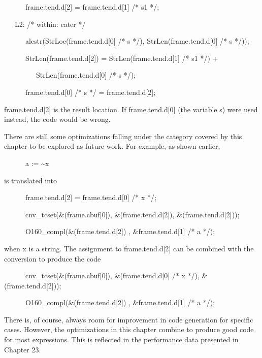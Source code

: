 {\ttfamily\mdseries
\ \ \ \ \ \ frame.tend.d[2] = frame.tend.d[1] /* s1 */;}

{\ttfamily\mdseries
\ \ \ L2: /* within: cater */}

{\ttfamily\mdseries
\ \ \ \ \ \ alcstr(StrLoc(frame.tend.d[0] /* s */), StrLen(frame.tend.d[0] /* s */));}

{\ttfamily\mdseries
\ \ \ \ \ \ StrLen(frame.tend.d[2]) = StrLen(frame.tend.d[1] /* s1 */) +}

{\ttfamily\mdseries
\ \ \ \ \ \ \ \ \ StrLen(frame.tend.d[0] /* s */);}


\bigskip

{\ttfamily\mdseries
\ \ \ \ \ \ frame.tend.d[0] /* s */ = frame.tend.d[2];}


frame.tend.d[2] is the result location. If frame.tend.d[0] (the
variable s) were used instead, the code would be wrong.


There are still some optimizations falling under the category covered
by this chapter to be explored as future work. For example, as shown
earlier,

{\ttfamily\mdseries
\ \ \ \ \ \ a := \~{}x}

\noindent is translated into

{\ttfamily\mdseries
\ \ \ \ \ \ frame.tend.d[2] = frame.tend.d[0] /* x */;}

{\ttfamily\mdseries
\ \ \ \ \ \ cnv\_tcset(\&(frame.cbuf[0]), \&(frame.tend.d[2]), \&(frame.tend.d[2]));}

{\ttfamily\mdseries
\ \ \ \ \ \ O160\_compl(\&(frame.tend.d[2]) , \&frame.tend.d[1] /* a */);}

\noindent when x is a string. The assignment to frame.tend.d[2] can be
combined with the conversion to produce the code

{\ttfamily\mdseries
\ \ \ \ \ \ cnv\_tcset(\&(frame.cbuf[0]), \&(frame.tend.d[0] /* x */), \&(frame.tend.d[2]));}

{\ttfamily\mdseries
\ \ \ \ \ \ O160\_compl(\&(frame.tend.d[2]) , \&frame.tend.d[1] /* a */);}

There is, of course, always room for improvement in code generation
for specific cases. However, the optimizations in this chapter combine
to produce good code for most expressions. This is reflected in the
performance data presented in Chapter 23.

